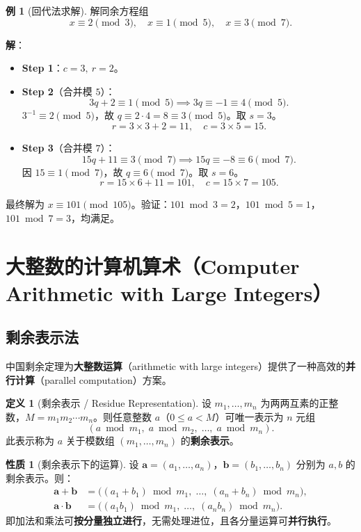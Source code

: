 \documentclass[UTF8,11pt,a4paper]{ctexbook}   %
\theoremstyle{definition}
\newtheorem{definition}{定义}[section]
\newtheorem{example}{例}[section]
\newtheorem{property}{性质}[section]
\begin{document}
\begin{example}[回代法求解]
解同余方程组
\[
x \equiv 2 \pmod{3},\quad x \equiv 1 \pmod{5},\quad x \equiv 3 \pmod{7}.
\]

\textbf{解}：
\begin{itemize}
    \item \textbf{Step 1}：$c=3,\ r=2$。
    \item \textbf{Step 2}（合并模 $5$）：
    \[
    3q + 2 \equiv 1 \pmod{5} \implies 3q \equiv -1 \equiv 4 \pmod{5}.
    \]
    $3^{-1} \equiv 2 \pmod{5}$，故 $q \equiv 2 \cdot 4 = 8 \equiv 3 \pmod{5}$。取 $s=3$。
    \[
    r = 3 \times 3 + 2 = 11,\quad c = 3 \times 5 = 15.
    \]
    \item \textbf{Step 3}（合并模 $7$）：
    \[
    15q + 11 \equiv 3 \pmod{7} \implies 15q \equiv -8 \equiv 6 \pmod{7}.
    \]
    因 $15 \equiv 1 \pmod{7}$，故 $q \equiv 6 \pmod{7}$。取 $s=6$。
    \[
    r = 15 \times 6 + 11 = 101,\quad c = 15 \times 7 = 105.
    \]
\end{itemize}
最终解为 $x \equiv 101 \pmod{105}$。验证：$101 \bmod 3 = 2$，$101 \bmod 5 = 1$，$101 \bmod 7 = 3$，均满足。
\end{example}

\section{大整数的计算机算术（Computer Arithmetic with Large Integers）}

\subsection{剩余表示法}

中国剩余定理为\textbf{大整数运算}（arithmetic with large integers）提供了一种高效的\textbf{并行计算}（parallel computation）方案。

\begin{definition}[剩余表示 / Residue Representation]
设 $m_1, \ldots, m_n$ 为两两互素的正整数，$M = m_1 m_2 \cdots m_n$。则任意整数 $a$（$0 \leq a < M$）可唯一表示为 $n$ 元组
\[
(a \bmod m_1,\; a \bmod m_2,\; \ldots,\; a \bmod m_n).
\]
此表示称为 $a$ 关于模数组 $(m_1,\ldots,m_n)$ 的\textbf{剩余表示}。
\end{definition}

\begin{property}[剩余表示下的运算]
设 $\mathbf{a} = (a_1,\ldots,a_n)$，$\mathbf{b} = (b_1,\ldots,b_n)$ 分别为 $a, b$ 的剩余表示。则：
\begin{align*}
\mathbf{a} + \mathbf{b} &= \bigl((a_1+b_1)\bmod m_1,\; \ldots,\; (a_n+b_n)\bmod m_n\bigr),\\
\mathbf{a} \cdot \mathbf{b} &= \bigl((a_1 b_1)\bmod m_1,\; \ldots,\; (a_n b_n)\bmod m_n\bigr).
\end{align*}
即加法和乘法可\textbf{按分量独立进行}，无需处理进位，且各分量运算可\textbf{并行执行}。
\end{property}
\end{document}
